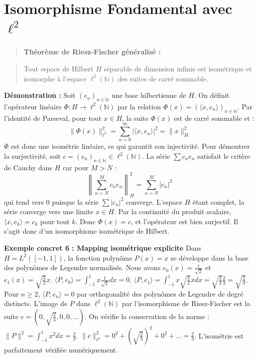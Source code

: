 \documentclass[11pt,a4paper]{article}
\begin{document}
\section{Isomorphisme Fondamental avec $\ell^2$}

\begin{quote}\textbf{Théorème de Riesz-Fischer généralisé :} \end{quote}
\begin{quote}Tout espace de Hilbert $H$ séparable de dimension infinie est isométrique et isomorphe à l'espace $\ell^2(\mathbb{N})$ des suites de carré sommable.\end{quote}

\textbf{Démonstration :}
Soit $(e_n)_{n \in \mathbb{N}}$ une base hilbertienne de $H$.
On définit l'opérateur linéaire $\Phi : H \to \ell^2(\mathbb{N})$ par la relation $\Phi(x) = (\langle x, e_n \rangle)_{n \in \mathbb{N}}$.
Par l'identité de Parseval, pour tout $x \in H$, la suite $\Phi(x)$ est de carré sommable et :
$$ \|\Phi(x)\|_{\ell^2}^2 = \sum_{n=0}^\infty |\langle x, e_n \rangle|^2 = \|x\|_H^2 $$
$\Phi$ est donc une isométrie linéaire, ce qui garantit son injectivité.
Pour démontrer la surjectivité, soit $c = (c_n)_{n \in \mathbb{N}} \in \ell^2(\mathbb{N})$.
La série $\sum c_n e_n$ satisfait le critère de Cauchy dans $H$ car pour $M > N$ :
$$ \left\| \sum_{n=N}^M c_n e_n \right\|_H^2 = \sum_{n=N}^M |c_n|^2 $$
qui tend vers 0 puisque la série $\sum |c_n|^2$ converge. L'espace $H$ étant complet, la série converge vers une limite $x \in H$.
Par la continuité du produit scalaire, $\langle x, e_k \rangle = c_k$ pour tout $k$. Donc $\Phi(x) = c$, et l'opérateur est bien surjectif.
Il s'agit donc d'un isomorphisme isométrique de Hilbert.

\textbf{Exemple concret 6 : Mapping isométrique explicite}
Dans $H = L^2([-1, 1])$, la fonction polynôme $P(x) = x$ se développe dans la base des polynômes de Legendre normalisés.
Nous avons $e_0(x) = \frac{1}{\sqrt{2}}$ et $e_1(x) = \sqrt{\frac{3}{2}} x$.
$\langle P, e_0 \rangle = \int_{-1}^1 x \frac{1}{\sqrt{2}} dx = 0$.
$\langle P, e_1 \rangle = \int_{-1}^1 x \sqrt{\frac{3}{2}} x dx = \sqrt{\frac{3}{2}} \frac{2}{3} = \sqrt{\frac{2}{3}}$.
Pour $n \geq 2$, $\langle P, e_n \rangle = 0$ par orthogonalité des polynômes de Legendre de degré distincts.
L'image de $P$ dans $\ell^2(\mathbb{N})$ par l'isomorphisme de Riesz-Fischer est la suite $c = (0, \sqrt{\frac{2}{3}}, 0, 0, \dots)$.
On vérifie la conservation de la norme :
$\|P\|^2 = \int_{-1}^1 x^2 dx = \frac{2}{3}$.
$\|c\|_{\ell^2}^2 = 0^2 + (\sqrt{\frac{2}{3}})^2 + 0^2 + \dots = \frac{2}{3}$.
L'isométrie est parfaitement vérifiée numériquement.
\end{document}
